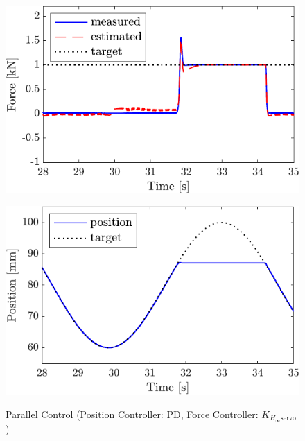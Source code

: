 \begin{figure}[t]
    \begin{minipage}{\minipageratio\hsize}
    \centering
        \includegraphics[keepaspectratio, scale = \minifigscale]{contents/IntegrationControl/figure/SECASQ/crop-FBsw_JFPS4_force.pdf}
        \label{fig5:crop-FBsw_JFPS4_force}
    \end{minipage}
    \begin{minipage}{\minipageratio\hsize}
    \centering
        \includegraphics[keepaspectratio, scale = \minifigscale]
        {contents/IntegrationControl/figure/SECASQ/crop-FBsw_JFPS4_pos.pdf}
        \label{fig5:crop-FBsw_JFPS4_pos}
    \end{minipage}
    \caption{Parallel Control (Position Controller: PD, Force Controller: $K_{H_\infty\mathrm{servo}}$)}   
    \label{fig5:crop-FBsw_JFPS4}
\end{figure}


